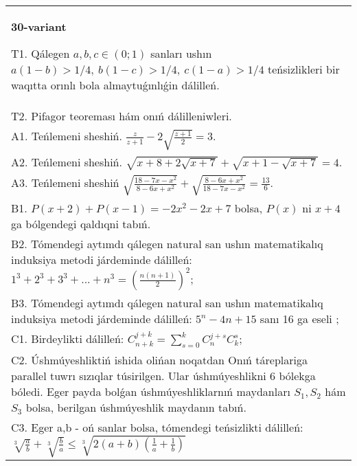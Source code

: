 \documentclass{article}
\begin{document}
\begin{tabular}{m{17cm}}
\textbf{30-variant}
\newline

T1. Qálegen \(a,b,c \in (0;1)\) sanları ushın \(a(1 - b) > 1/4,\ b(1 - c) > 1/4,\ c(1 - a) > 1/4\) teńsizlikleri bir waqıtta orınlı bola almaytuǵınlıǵin dálilleń. \\
T2. Pifagor teoreması hám onıń dálilleniwleri. \\
A1. Teńlemeni sheshiń. \(\frac{z}{z + 1} - 2\sqrt{\frac{z + 1}{2}} = 3\). \\
A2. Teńlemeni sheshiń. \(\sqrt{x + 8 + 2\sqrt{x + 7}} + \sqrt{x + 1 - \sqrt{x + 7}} = 4\). \\
A3. Teńlemeni sheshiń \(\sqrt{\frac{18 - 7x - x^{2}}{8 - 6x + x^{2}}} + \sqrt{\frac{8 - 6x + x^{2}}{18 - 7x - x^{2}}} = \frac{13}{6}\). \\
B1. \(P(x + 2) + P(x - 1) = - 2x^{2} - 2x + 7\) bolsa, \(P(x)\) ni \(x + 4\) ga bólgendegi qaldıqni tabıń. \\
B2. Tómendegi aytımdı qálegen natural san ushın matematikalıq induksiya metodi járdeminde dálilleń: \(1^{3} + 2^{3} + 3^{3} + ... + n^{3} = \left( \frac{n(n + 1)}{2} \right)^{2}\); \\
B3. Tómendegi aytımdı qálegen natural san ushın matematikalıq induksiya metodi járdeminde dálilleń: \(5^{n} - 4n + 15\) sanı 16 ga eseli ; \\
C1. Birdeylikti dálilleń: \(C_{n + k}^{j + k} = \sum_{s = 0}^{k}C_{n}^{j + s}C_{k}^{s}\); \\
C2. Úshmúyeshliktiń ishida olińan noqatdan Onıń táreplariga parallel tuwrı sızıqlar túsirilgen. Ular úshmúyeshlikni 6 bólekga bóledi. Eger payda bolǵan úshmúyeshliklarnıń maydanları \(S_{1},S_{2}\) hám \(S_{3}\) bolsa, berilgan úshmúyeshlik maydanın tabıń. \\
C3. Eger a,b - oń sanlar bolsa, tómendegi teńsizlikti dálilleń: \(\sqrt[3]{\frac{a}{b}} + \sqrt[3]{\frac{b}{a}} \leq \sqrt[3]{2(a + b)\left( \frac{1}{a} + \frac{1}{b} \right)}\) \\

\end{tabular}
\vspace{1cm}
\end{document}
